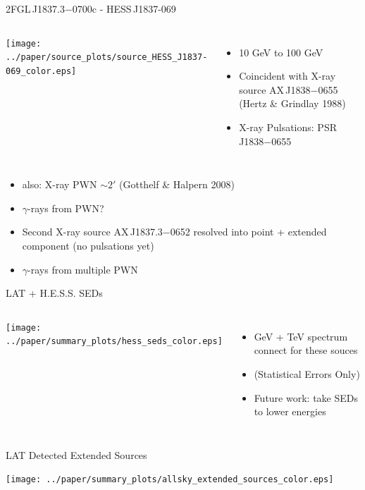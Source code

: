 \documentclass[12pt]{beamer}
\begin{document}
\begin{frame}{2FGL\,J1837.3$-$0700c - HESS\,J1837-069}
  \begin{columns}
    \texttt{[image: ../paper/source\_plots/source\_HESS\_J1837-069\_color.eps]}
    \begin{itemize}
      \item 10 GeV to 100 GeV
      \item Coincident with X-ray source
        AX\,J1838$-$0655 (Hertz \& Grindlay 1988)
      \item X-ray Pulsations: PSR\,J1838$-$0655 
    \end{itemize}
  \end{columns}
    \begin{itemize}
      \item also: X-ray PWN $\sim 2'$ 
        (Gotthelf \& Halpern 2008)
      \item $\gamma$-rays from PWN?
      \item Second X-ray source
        AX\,J1837.3$-$0652 resolved into
        point + extended component (no pulsations yet)
      \item $\gamma$-rays from multiple PWN
    \end{itemize}
\end{frame}

\begin{frame}{LAT + H.E.S.S. SEDs}
  \begin{columns}
    \texttt{[image: ../paper/summary\_plots/hess\_seds\_color.eps]}
\begin{itemize}
    \item GeV + TeV spectrum connect for
    these souces
  \item (Statistical Errors Only)
  \item
 Future work: take SEDs to lower
    energies
\end{itemize}

  \end{columns}
\end{frame}


\begin{frame}{LAT Detected Extended Sources}
  \begin{center}
    \texttt{[image: ../paper/summary\_plots/allsky\_extended\_sources\_color.eps]}
  \end{center}
\end{frame}
\end{document}
